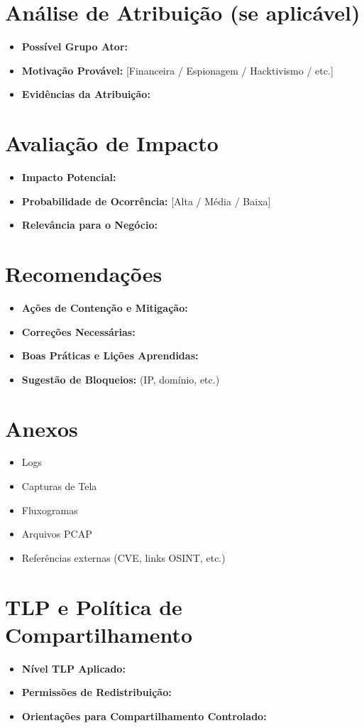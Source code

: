 \documentclass[12pt]{article}
\begin{document}
\section{Análise de Atribuição (se aplicável)}
\begin{itemize}[leftmargin=*]
    \item \textbf{Possível Grupo Ator:} 
    \item \textbf{Motivação Provável:} [Financeira / Espionagem / Hacktivismo / etc.]
    \item \textbf{Evidências da Atribuição:} 
\end{itemize}

\section{Avaliação de Impacto}
\begin{itemize}[leftmargin=*]
    \item \textbf{Impacto Potencial:} 
    \item \textbf{Probabilidade de Ocorrência:} [Alta / Média / Baixa]
    \item \textbf{Relevância para o Negócio:} 
\end{itemize}

\section{Recomendações}
\begin{itemize}[leftmargin=*]
    \item \textbf{Ações de Contenção e Mitigação:} 
    \item \textbf{Correções Necessárias:} 
    \item \textbf{Boas Práticas e Lições Aprendidas:} 
    \item \textbf{Sugestão de Bloqueios:} (IP, domínio, etc.)
\end{itemize}

\section{Anexos}
\begin{itemize}[leftmargin=*]
    \item Logs
    \item Capturas de Tela
    \item Fluxogramas
    \item Arquivos PCAP
    \item Referências externas (CVE, links OSINT, etc.)
\end{itemize}

\section{TLP e Política de Compartilhamento}
\begin{itemize}[leftmargin=*]
    \item \textbf{Nível TLP Aplicado:} 
    \item \textbf{Permissões de Redistribuição:} 
    \item \textbf{Orientações para Compartilhamento Controlado:} 
\end{itemize}
\end{document}
